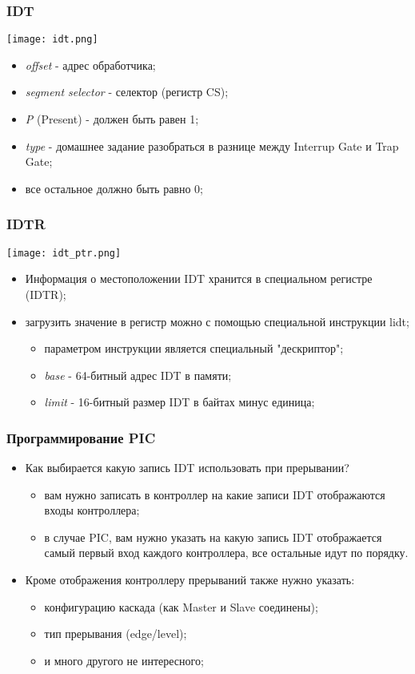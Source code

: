 \begin{frame}
\frametitle{IDT}
\begin{center}
  \texttt{[image: idt.png]}
\end{center}
\begin{itemize}
  \item \emph{offset} - адрес обработчика;
  \item \emph{segment selector} - селектор (регистр CS);
  \item \emph{P} (Present) - должен быть равен 1;
  \item \emph{type} - домашнее задание разобраться в разнице между Interrup
  Gate и Trap Gate;
  \item все остальное должно быть равно 0;
\end{itemize}
\end{frame}

\begin{frame}
\frametitle{IDTR}
\begin{center}
  \texttt{[image: idt\_ptr.png]}
\end{center}
\begin{itemize}
  \item Информация о местоположении IDT хранится в специальном регистре (IDTR);
  \item загрузить значение в регистр можно с помощью специальной инструкции
  lidt;
  \begin{itemize}
    \item параметром инструкции является специальный "дескриптор";
    \item \emph{base} - 64-битный адрес IDT в памяти;
    \item \emph{limit} - 16-битный размер IDT в байтах минус единица;
  \end{itemize}
\end{itemize}
\end{frame}

\begin{frame}
\frametitle{Программирование PIC}
\begin{itemize}
  \item Как выбирается какую запись IDT использовать при прерывании?
  \begin{itemize}
    \item вам нужно записать в контроллер на какие записи IDT отображаются
    входы контроллера;
    \item в случае PIC, вам нужно указать на какую запись IDT отображается
    самый первый вход каждого контроллера, все остальные идут по порядку.
  \end{itemize}
  \item Кроме отображения контроллеру прерываний также нужно указать:
  \begin{itemize}
    \item конфигурацию каскада (как Master и Slave соединены);
    \item тип прерывания (edge/level);
    \item и много другого не интересного;
  \end{itemize}
\end{itemize}
\end{frame}

